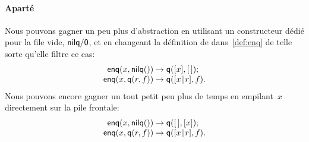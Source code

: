 \paragraph{Aparté}

Nous pouvons gagner un peu plus d'abstraction en utilisant un constructeur dédié pour la file vide, \(\textsf{nilq/0}\), et en changeant la définition de
 dans~\eqref{def:enq}  de telle sorte qu'elle
filtre ce cas:
\begin{equation*}
\begin{array}{r@{\;}l@{\;}l}
\fun{enq}(x,\fun{nilq}()) & \rightarrow & \fun{q}([x],\el);\\
\fun{enq}(x,\fun{q}(r,f)) & \rightarrow & \fun{q}(\cons{x}{r},f).
\end{array}
\end{equation*}
Nous pouvons encore gagner un tout petit peu plus de temps en
empilant~\(x\) directement sur la pile frontale:
\begin{equation*}
\begin{array}{r@{\;}l@{\;}l}
\fun{enq}(x,\fun{nilq}()) & \rightarrow & \fun{q}(\el,[x]);\\
\fun{enq}(x,\fun{q}(r,f)) & \rightarrow & \fun{q}(\cons{x}{r},f).
\end{array}
\end{equation*}

